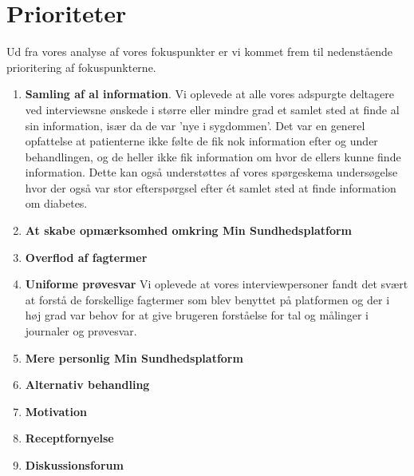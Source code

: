 \section{Prioriteter}
Ud fra vores analyse af vores fokuspunkter er vi kommet frem til nedenstående prioritering af fokuspunkterne.\\
\begin{enumerate}
	\item \textbf{Samling af al information}. Vi oplevede at alle vores adspurgte deltagere ved interviewsne ønskede i større eller mindre grad et samlet sted at finde al sin information, især da de var 'nye i sygdommen'. Det var en generel opfattelse at patienterne ikke følte de fik nok information efter og under behandlingen, og de heller ikke fik information om hvor de ellers kunne finde information. Dette kan også understøttes af vores spørgeskema undersøgelse hvor der også var stor efterspørgsel efter ét samlet sted at finde information om diabetes.
	\item \textbf{At skabe opmærksomhed omkring Min Sundhedsplatform}
	\item \textbf{Overflod af fagtermer}
	\item \textbf{Uniforme prøvesvar} Vi oplevede at vores interviewpersoner fandt det svært at forstå de forskellige fagtermer som blev benyttet på platformen og der i høj grad var behov for at give brugeren forståelse for tal og målinger i journaler og prøvesvar.
	\item \textbf{Mere personlig Min Sundhedsplatform}
	\item \textbf{Alternativ behandling}
	\item \textbf{Motivation}
	\item \textbf{Receptfornyelse}
	\item \textbf{Diskussionsforum}
\end{enumerate}
